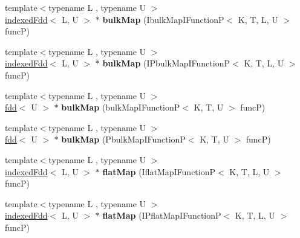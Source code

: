 \begin{DoxyCompactItemize}
\item 
\hypertarget{classfaster_1_1indexedFdd_a6ace49d5739205211ba154ada93c5a06}{}\label{classfaster_1_1indexedFdd_a6ace49d5739205211ba154ada93c5a06} 
{\footnotesize template$<$typename L , typename U $>$ }\\\hyperlink{classfaster_1_1indexedFdd}{indexed\+Fdd}$<$ L, U $>$ $\ast$ {\bfseries bulk\+Map} (Ibulk\+Map\+I\+FunctionP$<$ K, T, L, U $>$ funcP)
\item 
\hypertarget{classfaster_1_1indexedFdd_a2989dde370e2c25e98434249a8cc5130}{}\label{classfaster_1_1indexedFdd_a2989dde370e2c25e98434249a8cc5130} 
{\footnotesize template$<$typename L , typename U $>$ }\\\hyperlink{classfaster_1_1indexedFdd}{indexed\+Fdd}$<$ L, U $>$ $\ast$ {\bfseries bulk\+Map} (I\+Pbulk\+Map\+I\+FunctionP$<$ K, T, L, U $>$ funcP)
\item 
\hypertarget{classfaster_1_1indexedFdd_a661567a1e05b508619c9399b2149d7d7}{}\label{classfaster_1_1indexedFdd_a661567a1e05b508619c9399b2149d7d7} 
{\footnotesize template$<$typename L , typename U $>$ }\\\hyperlink{classfaster_1_1fdd}{fdd}$<$ U $>$ $\ast$ {\bfseries bulk\+Map} (bulk\+Map\+I\+FunctionP$<$ K, T, U $>$ funcP)
\item 
\hypertarget{classfaster_1_1indexedFdd_a73ba7acbff0aabd4e8f92d07c3920d3a}{}\label{classfaster_1_1indexedFdd_a73ba7acbff0aabd4e8f92d07c3920d3a} 
{\footnotesize template$<$typename L , typename U $>$ }\\\hyperlink{classfaster_1_1fdd}{fdd}$<$ U $>$ $\ast$ {\bfseries bulk\+Map} (Pbulk\+Map\+I\+FunctionP$<$ K, T, U $>$ funcP)
\item 
\hypertarget{classfaster_1_1indexedFdd_a9c104d832a84dc9f3f648db7c0ea1374}{}\label{classfaster_1_1indexedFdd_a9c104d832a84dc9f3f648db7c0ea1374} 
{\footnotesize template$<$typename L , typename U $>$ }\\\hyperlink{classfaster_1_1indexedFdd}{indexed\+Fdd}$<$ L, U $>$ $\ast$ {\bfseries flat\+Map} (Iflat\+Map\+I\+FunctionP$<$ K, T, L, U $>$ funcP)
\item 
\hypertarget{classfaster_1_1indexedFdd_afe4a7200c3b0adfe13d9479b2e89d015}{}\label{classfaster_1_1indexedFdd_afe4a7200c3b0adfe13d9479b2e89d015} 
{\footnotesize template$<$typename L , typename U $>$ }\\\hyperlink{classfaster_1_1indexedFdd}{indexed\+Fdd}$<$ L, U $>$ $\ast$ {\bfseries flat\+Map} (I\+Pflat\+Map\+I\+FunctionP$<$ K, T, L, U $>$ funcP)
\item 

\end{DoxyCompactItemize}
